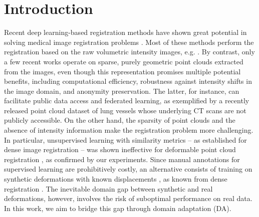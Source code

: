 \documentclass[runningheads]{llncs}
\begin{document}
\section{Introduction}
Recent deep learning-based registration methods have shown great potential in solving medical image registration problems \cite{fu2020deep,haskins2020deep}.
Most of these methods perform the registration based on the raw volumetric intensity images, e.g. \cite{balakrishnan2019voxelmorph,chen2022transmorph,de2019deep,mok2020large,zhao2019recursive}.
By contrast, only a few recent works \cite{hansen2021deep,shen2021accurate} operate on sparse, purely geometric point clouds extracted from the images, even though this representation promises multiple potential benefits, including computational efficiency, robustness against intensity shifts in the image domain, and anonymity preservation.
The latter, for instance, can facilitate public data access and federated learning, as exemplified by a recently released point cloud dataset of lung vessels \cite{shen2021accurate} whose underlying CT scans are not publicly accessible.
On the other hand, the sparsity of point clouds and the absence of intensity information make the registration problem more challenging.
In particular, unsupervised learning with similarity metrics -- as established for dense image registration \cite{chen2022transmorph,mok2020large} -- was shown ineffective for deformable point cloud registration \cite{shen2021accurate}, as confirmed by our experiments.
Since manual annotations for supervised learning are prohibitively costly, an alternative consists of training on synthetic deformations with known displacements \cite{shen2021accurate}, as known from dense registration \cite{eppenhof2018pulmonary,uzunova2017training}.
The inevitable domain gap between synthetic and real deformations, however, involves the risk of suboptimal performance on real data.
In this work, we aim to bridge this gap through domain adaptation (DA).
\end{document}
